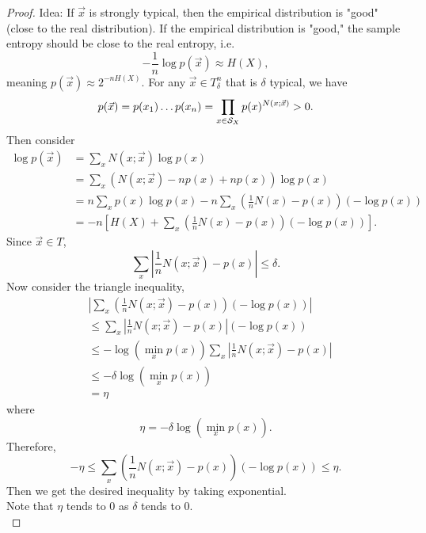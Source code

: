 \documentclass[../main.tex]{subfiles}
\begin{document}
\begin{proof}
Idea:
    If $\vec x$ is strongly typical, then the empirical distribution is "good" (close to the real distribution). If the empirical distribution is "good," the sample entropy should be close to the real entropy, i.e. \[
    -\frac{1}{n}\log p(\vec x) \approx H(X),
    \] meaning $p(\vec x)\approx 2^{-nH(X)}$.
    \newline
    For any $\vec x \in T^n_\delta$ that is $\delta$ typical, we have \[
    p(\vec x)=p(x_1)\dots p(x_n) = \prod_{x\in \S_X}p(x)^{N(x;\vec x)} > 0.
    \] Then consider \begin{align*}
        \log p(\vec x) &= \sum_x N(x;\vec x)\log p(x)\\
        &= \sum_x (N(x;\vec x)-np(x)+np(x))\log p(x)\\
        &=n\sum_x p(x)\log p(x) - n\sum_x(\frac{1}{n}N(x)-p(x))(-\log p(x))\\
        &=-n [H(X)+\sum_x(\frac{1}{n}N(x)-p(x))(-\log p(x))].
    \end{align*}
    Since $\vec x\in T$, \[
    \sum_x|\frac{1}{n}N(x;\vec x)-p(x)| \leq \delta.
    \]
    Now consider the triangle inequality,
    \begin{align*}
        &|\sum_{x}(\frac{1}{n}N(x;\vec x)-p(x))(-\log p(x))|\\
        &\leq \sum_{x}|\frac{1}{n}N(x;
        \vec x)-p(x)|(-\log p(x))\\
        &\leq - \log(\min_x p(x))\sum_{x}|\frac{1}{n}N(x;
        \vec x)-p(x)|\\
        &\leq -\delta \log(\min_x p(x))\\
        &=\eta
    \end{align*} where \[
    \eta = -\delta\log(\min_xp(x)).
    \]
    Therefore, \[
    -\eta\leq \sum_x(\frac{1}{n}N(x;\vec x)-p(x))(-\log p(x))\leq \eta.
    \]
    Then we get the desired inequality by taking exponential.\\
    Note that $\eta$ tends to $0$ as $\delta$ tends to $0$.\\


\end{proof}
\end{document}

